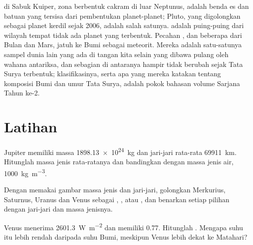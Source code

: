  di Sabuk Kuiper, zona berbentuk cakram di luar Neptunus, adalah benda es dan batuan yang tersisa dari pembentukan planet-planet; Pluto, yang digolongkan sebagai planet kerdil sejak 2006, adalah salah satunya.  adalah puing-puing dari wilayah tempat tidak ada planet yang terbentuk. Pecahan , dan beberapa dari Bulan dan Mars, jatuh ke Bumi sebagai meteorit. Mereka adalah satu-satunya sampel dunia lain yang ada di tangan kita selain yang dibawa pulang oleh wahana antariksa, dan sebagian di antaranya hampir tidak berubah sejak Tata Surya terbentuk; klasifikasinya, serta apa yang mereka katakan tentang komposisi Bumi dan umur Tata Surya, adalah pokok bahasan volume Sarjana Tahun ke-2.

\section{Latihan}

\begin{exercise}[$\star$]\label{exo:b1:comparative-planetology:1}
Jupiter memiliki massa \qty{1898.13e24}{kg} dan jari-jari rata-rata \qty{69911}{km}. Hitunglah massa jenis rata-ratanya dan bandingkan dengan massa jenis air, \qty{1000}{kg.m^{-3}}.
\end{exercise}

\begin{exercise}[$\star$]\label{exo:b1:comparative-planetology:2}
Dengan memakai gambar massa jenis dan jari-jari, golongkan Merkurius, Saturnus, Uranus dan Venus sebagai , , atau , dan benarkan setiap pilihan dengan jari-jari dan massa jenisnya.
\end{exercise}

\begin{exercise}[$\star$]\label{exo:b1:comparative-planetology:3}
Venus menerima \qty{2601.3}{W.m^{-2}} dan memiliki  0.77. Hitunglah . Mengapa suhu itu lebih rendah daripada suhu Bumi, meskipun Venus lebih dekat ke Matahari?
\end{exercise}

